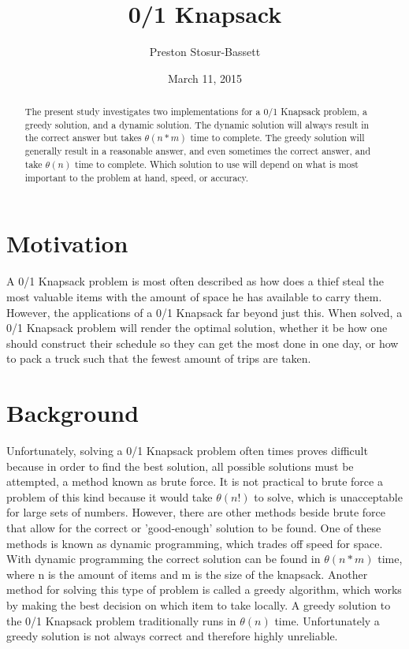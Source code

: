 \documentclass[onecolumn, 12pt, article]{IEEEtran}
\numberwithin{case}{problem}
\numberwithin{condition}{problem}
\numberwithin{condition}{subsection}
\numberwithin{definition}{section}
\theoremstyle{remark}
\numberwithin{question}{problem}
\theoremstyle{plain}
\numberwithin{answer}{problem}
\numberwithin{solution}{section}
\numberwithin{equation}{section}%
\begin{document}
\title{0/1 Knapsack}
\author{Preston Stosur-Bassett}
\date{March 11, 2015}
\maketitle

\pagestyle{fancy}

\begin{abstract}
The present study investigates two implementations for a 0/1 Knapsack problem, a greedy solution, and a dynamic solution. The dynamic solution will always result in the correct answer but takes $\theta(n*m)$ time to complete. The greedy solution will generally result in a reasonable answer, and even sometimes the correct answer, and take $\theta(n)$ time to complete. Which solution to use will depend on what is most important to the problem at hand, speed, or accuracy.

\end{abstract}

\section{Motivation}
A 0/1 Knapsack problem is most often described as how does a thief steal the most valuable items with the amount of space he has available to carry them. However, the applications of a 0/1 Knapsack far beyond just this. When solved, a 0/1 Knapsack problem will render the optimal solution, whether it be how one should construct their schedule so they can get the most done in one day, or how to pack a truck such that the fewest amount of trips are taken. 


\section{Background}
Unfortunately, solving a 0/1 Knapsack problem often times proves difficult because in order to find the best solution, all possible solutions must be attempted, a method known as brute force. It is not practical to brute force a problem of this kind because it would take $ \theta(n!) $ to solve, which is unacceptable for large sets of numbers. However, there are other methods beside brute force that allow for the correct or 'good-enough' solution to be found. One of these methods is known as dynamic programming, which trades off speed for space. With dynamic programming the correct solution can be found in $ \theta(n*m) $ time, where n is the amount of items and m is the size of the knapsack. Another method for solving this type of problem is called a greedy algorithm, which works by making the best decision on which item to take locally. A greedy solution to the 0/1 Knapsack problem traditionally runs in $ \theta(n) $ time. Unfortunately a greedy solution is not always correct and therefore highly unreliable.
\end{document}
